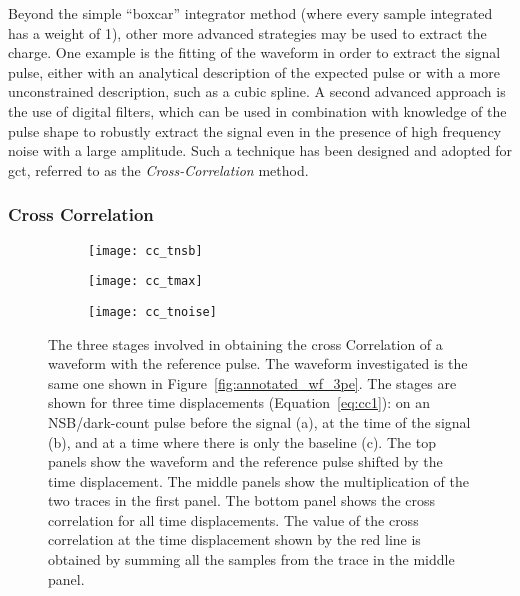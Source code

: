 Beyond the simple ``boxcar'' integrator method (where every sample integrated has a weight of 1), other more advanced strategies may be used to extract the charge. One example is the fitting of the waveform in order to extract the signal pulse, either with an analytical description of the expected pulse or with a more unconstrained description, such as a cubic spline. A second advanced approach is the use of digital filters, which can be used in combination with knowledge of the pulse shape to robustly extract the signal even in the presence of high frequency noise with a large amplitude. Such a technique has been designed and adopted for \gls{gct}, referred to as the \textit{Cross-Correlation} method. 

\subsubsection{Cross Correlation} \label{section:crosscorrelation}

\begin{figure}
  \begin{subfigure}[b]{0.32\textwidth}
    \texttt{[image: cc\_tnsb]}
    \caption{}
    \label{fig:cc_tnsb}
  \end{subfigure}
  \hfill
  \begin{subfigure}[b]{0.32\textwidth}
    \texttt{[image: cc\_tmax]}
    \caption{}
    \label{fig:cc_tmax}
  \end{subfigure}
  \centering
  \begin{subfigure}[b]{0.32\textwidth}
    \texttt{[image: cc\_tnoise]}
    \caption{}
    \label{fig:cc_tnoise}
  \end{subfigure}
  \caption[Cross correlation stages.]{The three stages involved in obtaining the cross Correlation of a waveform with the reference pulse. The waveform investigated is the same one shown in Figure~\ref{fig:annotated_wf_3pe}. The stages are shown for three time displacements (Equation~\ref{eq:cc1}): on an NSB/dark-count pulse before the signal (a), at the time of the signal (b), and at a time where there is only the baseline (c). The top panels show the waveform and the reference pulse shifted by the time displacement. The middle panels show the multiplication of the two traces in the first panel. The bottom panel shows the cross correlation for all time displacements. The value of the cross correlation at the time displacement shown by the red line is obtained by summing all the samples from the trace in the middle panel.}
    \label{fig:cc}
\end{figure}

